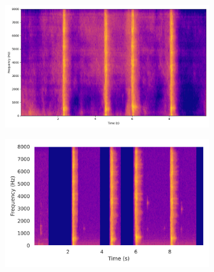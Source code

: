 \begin{figure}[htbp]
\begin{subfigure}[b]{0.185\textwidth}
        \includegraphics[width=\textwidth]{plots/sword_swoosh/clap sep_spectrogram.png}
    \end{subfigure}
    \begin{subfigure}[b]{0.185\textwidth}
        \centering
        \includegraphics[width=\textwidth]{plots/sword_swoosh/clap target_spectrogram.png}
    \end{subfigure}


\end{figure}
